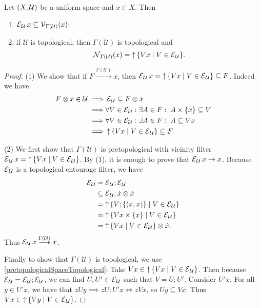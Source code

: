 \begin{proposition} \label{topologicalInducedUniformConvergence}
Let $\sSet{X,\mathcal{U}}$ be a uniform space and $x\in X$. Then
\begin{enumerate}
\item $\operatorname{\mathcal{E}}_\mathcal{U}x \subseteq \operatorname{\mathcal{V}}_{\Gamma(\mathcal{U})}(x)$;
\item if $\mathcal{U}$ is topological, then $\Gamma(\mathcal{U})$ is topological and
\[ \neighbourhood_{\Gamma(\mathcal{U})}(x) = \upset \setbuilder{V x}{V\in \entourage_\mathcal{U}}. \]
\end{enumerate}
\end{proposition}
\begin{proof}
(1) We show that if $F\overset{\Gamma(\mathcal{U})}{\longrightarrow} x$, then $\entourage_\mathcal{U}x = \upset \setbuilder{V x}{V\in \entourage_\mathcal{U}}\subseteq F$. Indeed we have
\begin{align*}
F\otimes \pfilter{x}\in \mathcal{U} \implies& \entourage_\mathcal{U}\subseteq F\otimes \pfilter{x} \\
\implies& \forall V\in \entourage_\mathcal{U}: \exists A\in F: \; A\times \{x\} \subseteq V \\
\implies& \forall  V\in \entourage_\mathcal{U}: \exists A\in F: \; A \subseteq V x \\
\implies& \upset \setbuilder{V x}{V\in \entourage_\mathcal{U}}\subseteq F.
\end{align*}

(2) We first show that $\Gamma(\mathcal{U})$ is pretopological with vicinity filter $\entourage_\mathcal{U}x = \upset \setbuilder{V x}{V\in \entourage_\mathcal{U}}$. By (1), it is enough to prove that $\operatorname{\mathcal{E}}_\mathcal{U}x \to x$.
Because $\operatorname{\mathcal{E}}_\mathcal{U}$ is a topological entourage filter, we have
\begin{align*}
\entourage_\mathcal{U} &= \entourage_\mathcal{U};\entourage_\mathcal{U} \\
&\subseteq \entourage_\mathcal{U}; \pfilter{x}\otimes \pfilter{x} \\
&= \upset \setbuilder{V; \{(x,x)\}}{V\in \entourage_\mathcal{U}} \\
&= \upset \setbuilder{V x\times\{x\}}{V\in \entourage_\mathcal{U}} \\
&= \upset \setbuilder{V x}{V\in \entourage_\mathcal{U}}\otimes \pfilter{x}.
\end{align*}
Thus $\operatorname{\mathcal{E}}_\mathcal{U}x \overset{\Gamma(\mathcal{U})}{\longrightarrow} x$.

Finally to show that $\Gamma(\mathcal{U})$ is topological, we use \ref{pretopologicalSpaceTopological}: Take $Vx\in \upset \setbuilder{V x}{V\in \entourage_\mathcal{U}}$. Then because $\operatorname{\mathcal{E}}_\mathcal{U} = \operatorname{\mathcal{E}}_\mathcal{U};\operatorname{\mathcal{E}}_\mathcal{U}$, we can find $U,U'\in \operatorname{\mathcal{E}}_\mathcal{U}$ such that $V = U;U'$. Consider $U'x$. For all $y\in U'x$, we have that $zUy \implies zU;U'x \iff zVx$, so $Uy \subseteq Vx$. Thus $Vx \in \upset \setbuilder{V y}{V\in \entourage_\mathcal{U}}$.
\end{proof}

